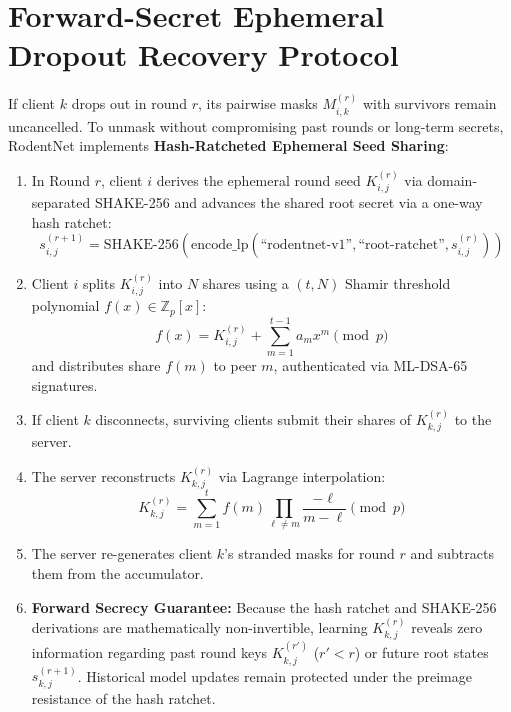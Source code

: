 \documentclass[11pt,a4paper]{report}
\begin{document}
\section{Forward-Secret Ephemeral Dropout Recovery Protocol}
If client $k$ drops out in round $r$, its pairwise masks $M_{i,k}^{(r)}$ with survivors remain uncancelled. To unmask without compromising past rounds or long-term secrets, RodentNet implements \textbf{Hash-Ratcheted Ephemeral Seed Sharing}:
\begin{enumerate}[itemsep=2pt]
  \item In Round $r$, client $i$ derives the ephemeral round seed $K_{i,j}^{(r)}$ via domain-separated SHAKE-256 and advances the shared root secret via a one-way hash ratchet:
  \begin{equation}
  s_{i,j}^{(r+1)} = \text{SHAKE-256}(\text{encode\_lp}(\text{``rodentnet-v1''}, \text{``root-ratchet''}, s_{i,j}^{(r)}))
  \end{equation}
  \item Client $i$ splits $K_{i,j}^{(r)}$ into $N$ shares using a $(t, N)$ Shamir threshold polynomial $f(x) \in \mathbb{Z}_p[x]$:
  \begin{equation}
  f(x) = K_{i,j}^{(r)} + \sum_{m=1}^{t-1} a_m x^m \pmod p
  \end{equation}
  and distributes share $f(m)$ to peer $m$, authenticated via ML-DSA-65 signatures.
  \item If client $k$ disconnects, surviving clients submit their shares of $K_{k,j}^{(r)}$ to the server.
  \item The server reconstructs $K_{k,j}^{(r)}$ via Lagrange interpolation:
  \begin{equation}
  K_{k,j}^{(r)} = \sum_{m=1}^t f(m) \prod_{\ell \ne m} \frac{-\ell}{m - \ell} \pmod p
  \end{equation}
  \item The server re-generates client $k$'s stranded masks for round $r$ and subtracts them from the accumulator.
  \item \textbf{Forward Secrecy Guarantee:} Because the hash ratchet and SHAKE-256 derivations are mathematically non-invertible, learning $K_{k,j}^{(r)}$ reveals zero information regarding past round keys $K_{k,j}^{(r')}$ ($r' < r$) or future root states $s_{k,j}^{(r+1)}$. Historical model updates remain protected under the preimage resistance of the hash ratchet.
\end{enumerate}

\end{document}
